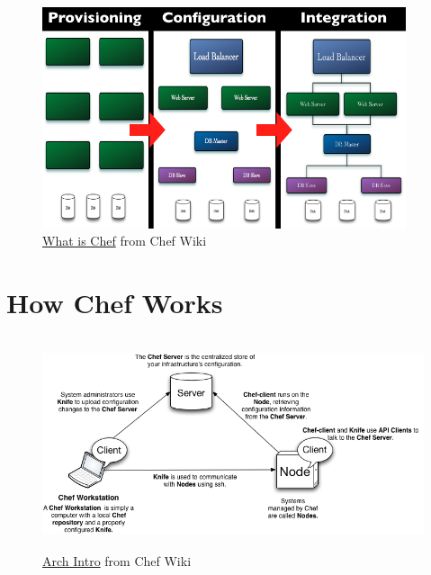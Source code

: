 \documentclass[xetex,mathserif,serif,12pt]{beamer}
\begin{document}
\begin{frame}
  \begin{beamer@nomargin}
  \begin{figure}
    \centering
    \includegraphics[height=6.5cm]{chefsi}
    \caption{\href{http://wiki.opscode.com/pages/viewpage.action?pageId=7274862}{What
        is Chef} from Chef Wiki}
    \label{fig:chefsi}
  \end{figure}
  \end{beamer@nomargin}
\end{frame}

\section{How Chef Works}
\label{sec:how-work}

\begin{frame}
  \begin{beamer@nomargin}
  \begin{figure}
    \centering
    \includegraphics[height=6.2cm]{chef-basics-nwc}
    \caption{\href{http://wiki.opscode.com/display/chef/Architecture+Introduction}{Arch Intro} from Chef Wiki}
    \label{fig:chef-basices}
  \end{figure}
  \end{beamer@nomargin}
\end{frame}
\end{document}
